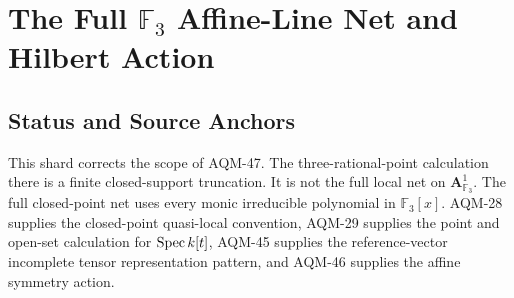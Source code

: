 
\section{The Full \texorpdfstring{\(\mathbb F_3\)}{F3} Affine-Line Net and Hilbert Action}
\label{sec:f3-full-affine-line-net-hilbert-action}

\subsection{Status and Source Anchors}
This shard corrects the scope of AQM-47.  The three-rational-point calculation
there is a finite closed-support truncation.  It is not the full local net on
\(\mathbf A^1_{\mathbb F_3}\).  The full closed-point net uses every monic
irreducible polynomial in \(\mathbb F_3[x]\).  AQM-28 supplies the
closed-point quasi-local convention, AQM-29 supplies the point and open-set
calculation for \(\operatorname{Spec} k[t]\), AQM-45 supplies the reference-vector incomplete
tensor representation pattern, and AQM-46 supplies the affine symmetry action.

